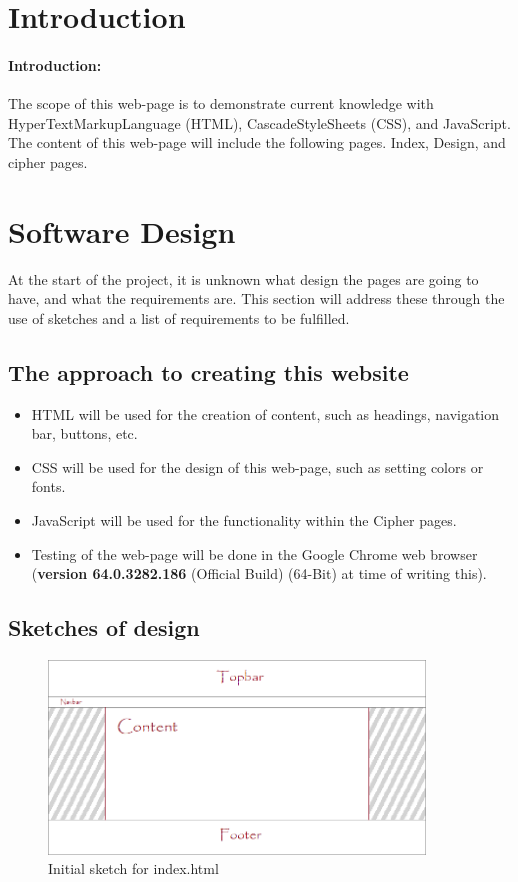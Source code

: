 \documentclass[10pt, a4paper]{article}
\title{\mytitle}
\author{\myauthor\hspace{1em}\\\contact\\Edinburgh Napier University\hspace{0.5em}-\hspace{0.5em}\mymodule}
\date{}
\begin{document}
    \maketitle


    \section{Introduction}
    \paragraph{Introduction:}
    The scope of this web-page is to demonstrate current knowledge with HyperTextMarkupLanguage (HTML), CascadeStyleSheets (CSS), and JavaScript. The content of this web-page will include the following pages. Index, Design, and cipher pages.


    \section{Software Design} 
    At the start of the project, it is unknown what design the pages are going to have, and what the requirements are. This section will address these through the use of sketches and a list of requirements to be fulfilled. 

    \subsection{The approach to creating this website}
    \begin{itemize}
    \item HTML will be used for the creation of content, such as headings, navigation bar, buttons, etc.
    \item CSS will be used for the design of this web-page, such as setting colors or fonts.  
    \item JavaScript will be used for the functionality within the Cipher pages. 
    \item Testing of the web-page will be done in the Google Chrome web browser (\textbf{version  64.0.3282.186 } (Official Build) (64-Bit) at time of writing this).
    \end{itemize}
    \subsection{Sketches of design} 
    \begin{figure}[H]
    \centering
    \includegraphics[width=100mm]{images/sketch_1.png}
    \caption{Initial sketch for index.html}
    \end{figure}
\end{document}
